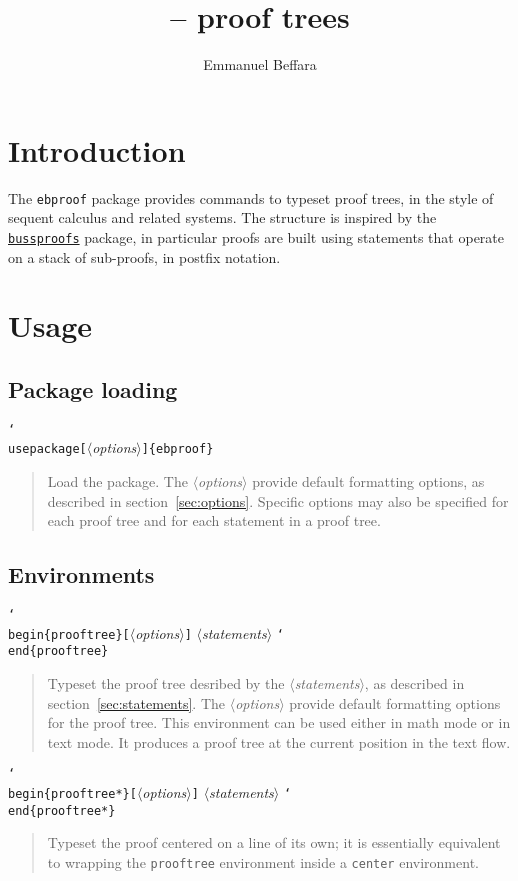 \documentclass{article}
\title{\package{ebproof} -- proof trees}
\author{Emmanuel Beffara}
\DeclareRobustCommand\package[1]{\texttt{#1}}
\newcommand\lit[1]{\texttt{#1}}
\newcommand\cs[1]{\lit{\char`\\#1}}
\newcommand\env[1]{\lit{#1}}
\newcommand\meta[1]{$\langle$\textit{#1}$\rangle$}
\newcommand\oarg[1]{\lit{[}\meta{#1}\lit{]}}
\newenvironment{csdoc}[1]{%
  \begin{flushleft}#1\end{flushleft}%
  \begin{quote}%
}{%
  \end{quote}%
}
\begin{document}
\maketitle

\tableofcontents

\section{Introduction}

The \env{ebproof} package provides commands to typeset proof trees, in the
style of sequent calculus and related systems.
The structure is inspired by the
\href{http://math.ucsd.edu/~sbuss/ResearchWeb/bussproofs/}{\package{bussproofs}}
package, in particular proofs are built using statements that operate on a
stack of sub-proofs, in postfix notation.

\section{Usage}

\subsection{Package loading}

\begin{csdoc}{\cs{usepackage}\oarg{options}\lit{\{ebproof\}}}
  Load the package.
  The \meta{options} provide default formatting options, as described in
  section~\ref{sec:options}.
  Specific options may also be specified for each proof tree and for each
  statement in a proof tree.
\end{csdoc}

\subsection{Environments}

\begin{csdoc}{
    \cs{begin}\lit{\{prooftree\}}\oarg{options}
      \meta{statements}
    \cs{end}\lit{\{prooftree\}}}
  Typeset the proof tree desribed by the \meta{statements}, as described in
  section~\ref{sec:statements}.
  The \meta{options} provide default formatting options for the proof tree.
  This environment can be used either in math mode or in text mode.
  It produces a proof tree at the current position in the text flow.
\end{csdoc}

\begin{csdoc}{
    \cs{begin}\lit{\{prooftree*\}}\oarg{options}
      \meta{statements}
    \cs{end}\lit{\{prooftree*\}}}
  Typeset the proof centered on a line of its own; it is essentially
  equivalent to wrapping the \env{prooftree} environment inside a \env{center}
  environment.
\end{csdoc}
\end{document}
